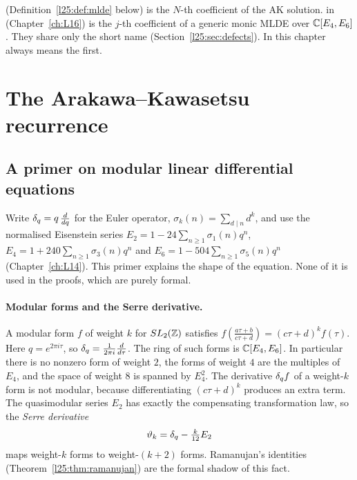 \begin{warning}[title={Two different \texttt{mldeCoeff}}]
 (Definition~\ref{l25:def:mlde} below) is the
$N$-th coefficient of the AK solution. 
in  (Chapter~\ref{ch:L16}) is the $j$-th coefficient
of a generic monic MLDE over ${\mathbb{C}}[E_4,E_6]$. They share only the short name (Section~\ref{l25:sec:defects}). In
this chapter  always means the first.
\end{warning}

\section{The Arakawa--Kawasetsu recurrence}\label{l25:sec:recurrence}

\subsection{A primer on modular linear differential equations}\label{l25:sec:primer}

Write $\delta_q=q\,\frac{d}{dq}$ for the Euler operator, $\sigma_k(n)=\sum_{d\mid n}d^k$, and use the normalised
Eisenstein series $E_2=1-24\sum_{n\ge1}\sigma_1(n)q^n$, $E_4=1+240\sum_{n\ge1}\sigma_3(n)q^n$ and
$E_6=1-504\sum_{n\ge1}\sigma_5(n)q^n$ (Chapter~\ref{ch:L14}). This primer explains the shape of the equation. None of
it is used in the proofs, which are purely formal.

\paragraph{Modular forms and the Serre derivative.} A modular form $f$ of weight $k$ for $SL_2({\mathbb{Z}})$ satisfies
$f(\frac{a\tau+b}{c\tau+d})=(c\tau+d)^kf(\tau)$. Here $q=e^{2\pi i\tau}$, so $\delta_q=\frac1{2\pi i}\frac{d}{d\tau}$.
The ring of such forms is ${\mathbb{C}}[E_4,E_6]$. In particular there is no nonzero form of weight $2$, the forms of weight $4$
are the multiples of $E_4$, and the space of weight $8$ is spanned by $E_4^2$. The derivative $\delta_q f$ of a
weight-$k$ form is not modular, because differentiating $(c\tau+d)^k$ produces an extra term. The quasimodular series
$E_2$ has exactly the compensating transformation law, so the \emph{Serre derivative}
\begin{equation*}
\vartheta_k=\delta_q-\tfrac{k}{12}E_2
\end{equation*}
maps weight-$k$ forms to weight-$(k+2)$ forms. Ramanujan's identities (Theorem~\ref{l25:thm:ramanujan}) are the formal
shadow of this fact.

